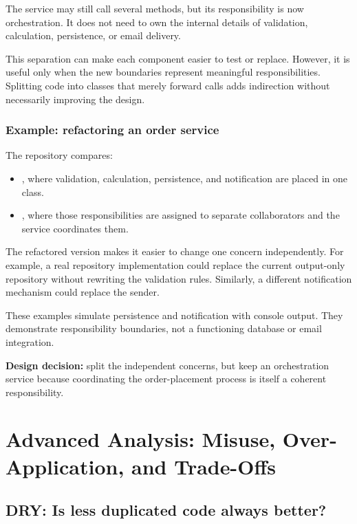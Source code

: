 \documentclass[12pt,a4paper]{article}
\begin{document}
The service may still call several methods, but its responsibility is now orchestration. It does not need to own the internal details of validation, calculation, persistence, or email delivery.

This separation can make each component easier to test or replace. However, it is useful only when the new boundaries represent meaningful responsibilities. Splitting code into classes that merely forward calls adds indirection without necessarily improving the design.

\subsubsection{Example: refactoring an order service}

The repository compares:

\begin{itemize}

\item {}, where validation, calculation, persistence, and notification are placed in one class.

\item {}, where those responsibilities are assigned to separate collaborators and the service coordinates them.

\end{itemize}

The refactored version makes it easier to change one concern independently. For example, a real repository implementation could replace the current output-only repository without rewriting the validation rules. Similarly, a different notification mechanism could replace the sender.

These examples simulate persistence and notification with console output. They demonstrate responsibility boundaries, not a functioning database or email integration.

\textbf{Design decision:} split the independent concerns, but keep an orchestration service because coordinating the order-placement process is itself a coherent responsibility.

\section{Advanced Analysis: Misuse, Over-Application, and Trade-Offs}

\subsection{DRY: Is less duplicated code always better?}
\end{document}
